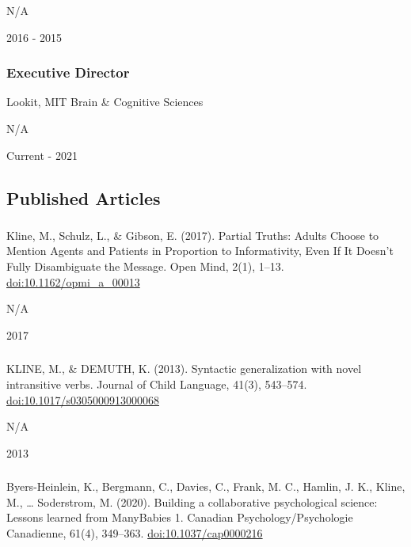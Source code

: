 \documentclass[
]{article}
\begin{document}
N/A

2016 - 2015

\hypertarget{executive-director}{%
\subsubsection{Executive Director}\label{executive-director}}

Lookit, MIT Brain \& Cognitive Sciences

N/A

Current - 2021

\hypertarget{published-articles}{%
\subsection{Published Articles}\label{published-articles}}

\hypertarget{section}{%
\subsubsection{}\label{section}}

Kline, M., Schulz, L., \& Gibson, E. (2017). Partial Truths: Adults
Choose to Mention Agents and Patients in Proportion to Informativity,
Even If It Doesn't Fully Disambiguate the Message. Open Mind, 2(1),
1--13. \url{doi:10.1162/opmi_a_00013}

N/A

2017

\hypertarget{section-1}{%
\subsubsection{}\label{section-1}}

KLINE, M., \& DEMUTH, K. (2013). Syntactic generalization with novel
intransitive verbs. Journal of Child Language, 41(3), 543--574.
\url{doi:10.1017/s0305000913000068}

N/A

2013

\hypertarget{section-2}{%
\subsubsection{}\label{section-2}}

Byers-Heinlein, K., Bergmann, C., Davies, C., Frank, M. C., Hamlin, J.
K., Kline, M., \ldots{} Soderstrom, M. (2020). Building a collaborative
psychological science: Lessons learned from ManyBabies 1. Canadian
Psychology/Psychologie Canadienne, 61(4), 349--363.
\url{doi:10.1037/cap0000216}
\end{document}
